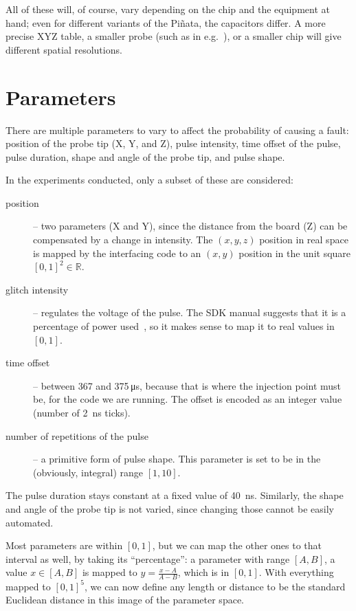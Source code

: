 \documentclass[times, utf8, diplomski]{fer}
\begin{document}
All of these will, of course, vary depending on the chip and the equipment at
hand; even for different variants of the Piñata, the capacitors differ.
A more precise XYZ table, a smaller probe (such as in e.g.~\cite{precise_probe_tips}),
or a smaller chip will give different spatial resolutions.


\section{Parameters}\label{sec:parameters}
There are multiple parameters to vary to affect the probability of causing a
fault: position of the probe tip (X, Y, and Z), pulse intensity, time offset
of the pulse, pulse duration, shape and angle of the probe tip, and pulse shape.

In the experiments conducted, only a subset of these are considered:
\begin{description}
  \item[position] -- two parameters (X and Y), since the distance from the board
        (Z) can be compensated by a change in intensity. The $(x,y,z)$ position
        in real space is mapped by the interfacing code to an $(x,y)$ position
        in the unit square $[0,1]^2 \in \mathbb{R}$.
  \item[glitch intensity] -- regulates the voltage of the pulse. The SDK manual
        suggests that it is a percentage of power used~\cite{RiscureVCGmanual},
        so it makes sense to map it to real values in $[0,1]$.
  \item[time offset] -- between 367 and 375\,\si{\micro\second}, because that is
        where the injection point must be, for the code we are running. The offset
        is encoded as an integer value (number of \SI{2}{\nano\second} ticks).
  \item[number of repetitions of the pulse] -- a primitive form of pulse shape.
        This parameter is set to be in the (obviously, integral) range $[1, 10]$.
\end{description}

The pulse duration stays constant at a fixed value of \SI{40}{\nano\second}.
Similarly, the shape and angle of the probe tip is not varied, since changing
those cannot be easily automated.

Most parameters are within $[0,1]$, but we can map the other ones to that
interval as well, by taking its ``percentage'': a parameter with range $[A,B]$,
a value $x \in [A,B]$ is mapped to $y = \frac{x-A}{A-B}$, which is in $[0,1]$.
With everything mapped to $[0,1]^5$, we can now define any length or distance
to be the standard Euclidean distance in this image of the parameter space.
\end{document}
